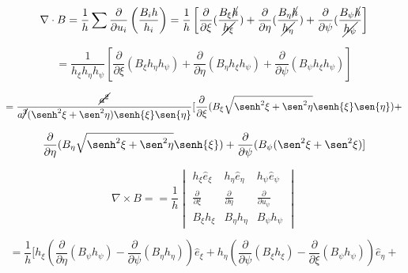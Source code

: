 \documentclass[12pt,a4paper]{article}
\begin{document}
\begin{enumerate}
\begin{enumerate}
        \vspace{1.7cm}
        
        \begin{equation*}
            \nabla \cdot B = \frac{1}{h} \sum \frac{\partial}{\partial u_i} \left(\frac{B_i h}{h_i} \right)= \frac{1}{h} \left[\frac{\partial}{\partial \xi}(\frac{B_\xi \cancel{h}}{\cancel{h_\xi}}) + \frac{\partial}{\partial \eta} (\frac{B_\eta\cancel{h}}{\cancel{h_\eta}}) + \frac{\partial}{\partial \psi} (\frac{B_\psi \cancel{h}}{\cancel{h_\psi}} \right]
        \end{equation*}
        
        \begin{equation*}
            = \frac{1}{h_\xi h_\eta h_\psi} \left[\frac{\partial}{\partial \xi}(B_\xi h_\eta h_\psi) + \frac{\partial}{\partial \eta} (B_\eta h_\xi h_\psi) + \frac{\partial}{\partial \psi}(B_\psi h_\xi h_\psi) \right]
        \end{equation*}
        
        \begin{equation*}
            = \frac{\cancel{a^2}}{a\cancel{^3} (\senh^2{\xi} + \sen^2{\eta})\senh{\xi} \sen{\eta}}[ \frac{\partial}{\partial \xi} (B_\xi \sqrt{\senh^2{\xi} +\sen^2{\eta}} \senh{\xi} \sen{\eta}) +
        \end{equation*}
        
        \begin{equation*}
             \frac{\partial}{\partial \eta} (B_\eta \sqrt{\senh^2{\xi} + \sen^2{\eta}}\senh{\xi}) +\frac{\partial}{\partial \psi} (B_\psi (\sen^2{\xi} + \sen^2{\xi})]
        \end{equation*}
        
        \vspace{1.7cm}
        
        \begin{equation*}
            \nabla \times B =  = \frac{1}{h}
            \begin{vmatrix}
                h_\xi \hat{e}_\xi & h_\eta \hat{e}_\eta & h_\psi \hat{e}_\psi\\
                \frac{\partial}{\partial \xi} & \frac{\partial }{\partial \eta} & \frac{\partial}{\partial u_\psi}\\
                B_\xi h_\xi & B_\eta h_\eta & B_\psi h_\psi
            \end{vmatrix}
        \end{equation*}
        
        \begin{equation*}
            =\frac{1}{h}[h_\xi(\frac{\partial}{\partial \eta}(B_\psi h_\psi) - \frac{\partial}{\partial \psi}(B_\eta h_\eta)) \hat{e}_\xi + h_\eta(\frac{\partial}{\partial \psi}(B_\xi h_\xi) - \frac{\partial}{\partial \xi}(B_\psi h_\psi))\hat{e}_\eta +
        \end{equation*}
        

\end{enumerate}
\end{enumerate}
\end{document}
